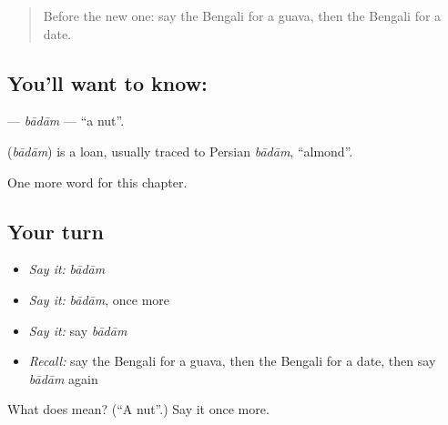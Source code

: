 \label{lesson:BN-C204-badam}



\begin{quote}
Before the new one: say the Bengali for a guava, then the Bengali for a date.
\end{quote}

\subsection*{You'll want to know: }
\textbf{} — \emph{bādām} — \textquotedblleft{}a nut\textquotedblright{}.

\begin{cousinweb}
\textbf{} (\emph{bādām}) is a loan, usually traced to Persian \emph{bādām}, \textquotedblleft{}almond\textquotedblright{}.
\end{cousinweb}

\begin{grammarlens}[title={What you've built}]
One more word for this chapter.
\end{grammarlens}

\subsection*{Your turn}
\begin{itemize}
\raggedright
  \item \emph{Say it:} \emph{bādām}
  \item \emph{Say it:} \emph{bādām}, once more
  \item \emph{Say it:} say \emph{bādām}
  \item \emph{Recall:} say the Bengali for a guava, then the Bengali for a date, then say \emph{bādām} again
\end{itemize}

\begin{tcolorbox}[breakable,colback=teal!4,colframe=teal!35!black,title={Before you move on}]
What does  mean? (\textquotedblleft{}A nut\textquotedblright{}.) Say it once more.
\end{tcolorbox}

